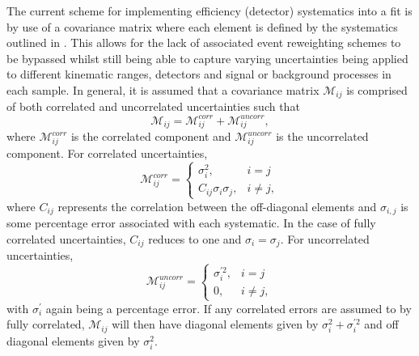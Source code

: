 The current scheme for implementing efficiency (detector) systematics into a fit is by use of a covariance matrix where each element is defined by the systematics outlined in  . This allows for the lack of associated event reweighting schemes to be bypassed whilst still being able to capture varying uncertainties being applied to different kinematic ranges, detectors and signal or background processes in each sample. In general, it is assumed that a covariance matrix $\mathcal{M}_{ij}$ is comprised of both correlated and uncorrelated uncertainties such that
\begin{equation}
    \mathcal{M}_{ij} = \mathcal{M}_{ij}^{corr} + \mathcal{M}_{ij}^{uncorr},
\end{equation}
where $\mathcal{M}_{ij}^{corr}$ is the correlated component and $\mathcal{M}_{ij}^{uncorr}$ is the uncorrelated component. For correlated uncertainties,
\begin{equation}
  \mathcal{M}_{ij}^{corr}=\begin{cases}
    \sigma_i^2, & \text{$i = j$}\\
    C_{ij} \sigma_i \sigma_j, & \text{$i \neq j$},
  \end{cases}
\end{equation}
where $C_{ij}$ represents the correlation between the off-diagonal elements and $\sigma_{i,j}$ is some percentage error associated with each systematic. In the case of fully correlated uncertainties, $C_{ij}$ reduces to one and $\sigma_i = \sigma_j$. For uncorrelated uncertainties,
\begin{equation}
  \mathcal{M}_{ij}^{uncorr}=\begin{cases}
    \sigma_i^{\prime2}, & \text{$i = j$}\\
    0, & \text{$i \neq j$},
  \end{cases}
\end{equation}
with $\sigma_i^{\prime}$ again being a percentage error. 
If any correlated errors are assumed to by fully correlated, $\mathcal{M}_{ij}$ will then have diagonal elements given by $\sigma_i^2 + \sigma_i^{\prime2}$ and off diagonal elements given by $\sigma_i^2$.

